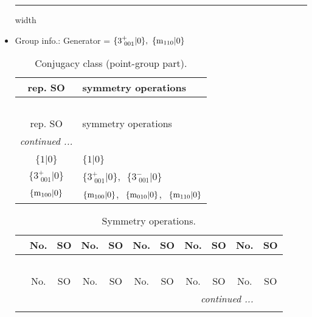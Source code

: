 \documentclass[fleqn,10pt,landscape]{article}
\begin{document}
\begin{itemize}
 \hfil \hrule height 1mm width \textwidth \hfil

\item Group info.: Generator = $\{3^{+}_{\,\,001}|0\},\,\,\{{\rm m}_{110}|0\}$

\begin{center}
\renewcommand{\arraystretch}{1.3}
\begin{longtable}{c|l}
\caption{Conjugacy class (point-group part).}
 \\
 \hline \hline
rep. SO & symmetry operations \\ \hline \endfirsthead

\multicolumn{1}{l}{\tablename\ \thetable{}} \\
 \hline \hline
rep. SO & symmetry operations \\ \hline \endhead

 \hline \hline
\multicolumn{1}{r}{\footnotesize\it continued ...} \\ \endfoot

 \hline \hline
\multicolumn{1}{r}{} \\ \endlastfoot

$\{1|0\}$ & $\{1|0\}$ \\ \hline
$\{3^{+}_{\,\,001}|0\}$ & $\{3^{+}_{\,\,001}|0\}$,\,\, $\{3^{-}_{\,\,001}|0\}$ \\ \hline
$\{{\rm m}_{100}|0\}$ & $\{{\rm m}_{100}|0\}$,\,\, $\{{\rm m}_{010}|0\}$,\,\, $\{{\rm m}_{110}|0\}$ \\
\end{longtable}
\end{center}
\begin{center}
\renewcommand{\arraystretch}{1.3}
\begin{longtable}{c|cc|cc|cc|cc|cc}
\caption{Symmetry operations.}
 \\
 \hline \hline
 & No. & SO & No. & SO & No. & SO & No. & SO & No. & SO \\ \hline \endfirsthead

\multicolumn{10}{l}{\tablename\ \thetable{}} \\
 \hline \hline
 & No. & SO & No. & SO & No. & SO & No. & SO & No. & SO \\ \hline \endhead

 \hline \hline
\multicolumn{10}{r}{\footnotesize\it continued ...} \\ \endfoot


\end{longtable}
\end{center}
\end{itemize}
\end{document}

